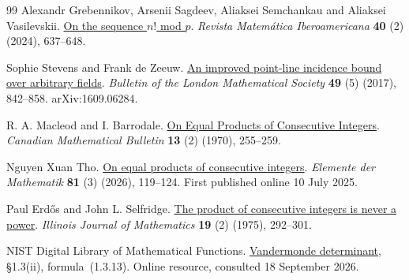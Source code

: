\documentclass[11pt]{article}
\begin{document}
\begin{thebibliography}{99}
Alexandr Grebennikov, Arsenii Sagdeev, Aliaksei Semchankau and Aliaksei Vasilevskii. \href{https://doi.org/10.4171/RMI/1422}{On the sequence $n!$ mod $p$}.
\emph{Revista Matemática Iberoamericana} \textbf{40} (2) (2024), 637--648.

Sophie Stevens and Frank de Zeeuw. \href{https://doi.org/10.1112/blms.12077}{An improved point-line incidence bound over arbitrary fields}.
\emph{Bulletin of the London Mathematical Society} \textbf{49} (5) (2017), 842--858. arXiv:1609.06284.

R. A. Macleod and I. Barrodale. \href{https://doi.org/10.4153/CMB-1970-052-8}{On Equal Products of Consecutive Integers}.
\emph{Canadian Mathematical Bulletin} \textbf{13} (2) (1970), 255--259.

{Nguyen Xuan Tho}. \href{https://doi.org/10.4171/EM/556}{On equal products of consecutive integers}.
\emph{Elemente der Mathematik} \textbf{81} (3) (2026), 119--124. First published online 10 July 2025.

Paul Erd{\H o}s and John L. Selfridge. \href{https://doi.org/10.1215/ijm/1256050816}{The product of consecutive integers is never a power}.
\emph{Illinois Journal of Mathematics} \textbf{19} (2) (1975), 292--301.

{NIST Digital Library of Mathematical Functions}.
\href{https://dlmf.nist.gov/1.3.E13}{Vandermonde determinant},
\S1.3(ii), formula~(1.3.13). Online resource, consulted 18 September 2026.

\end{thebibliography}
\end{document}
